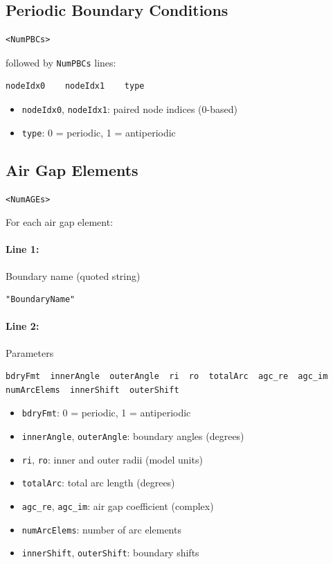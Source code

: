 \documentclass[11pt]{article}
\begin{document}
\subsection{Periodic Boundary Conditions}

\begin{lstlisting}
<NumPBCs>
\end{lstlisting}

followed by \texttt{NumPBCs} lines:

\begin{lstlisting}
nodeIdx0    nodeIdx1    type
\end{lstlisting}

\begin{itemize}[nosep]
  \item \texttt{nodeIdx0}, \texttt{nodeIdx1}: paired node indices (0-based)
  \item \texttt{type}: 0 = periodic, 1 = antiperiodic
\end{itemize}

\subsection{Air Gap Elements}

\begin{lstlisting}
<NumAGEs>
\end{lstlisting}

For each air gap element:

\paragraph{Line 1:} Boundary name (quoted string)
\begin{lstlisting}
"BoundaryName"
\end{lstlisting}

\paragraph{Line 2:} Parameters
\begin{lstlisting}
bdryFmt  innerAngle  outerAngle  ri  ro  totalArc  agc_re  agc_im  numArcElems  innerShift  outerShift
\end{lstlisting}

\begin{itemize}[nosep]
  \item \texttt{bdryFmt}: 0 = periodic, 1 = antiperiodic
  \item \texttt{innerAngle}, \texttt{outerAngle}: boundary angles (degrees)
  \item \texttt{ri}, \texttt{ro}: inner and outer radii (model units)
  \item \texttt{totalArc}: total arc length (degrees)
  \item \texttt{agc\_re}, \texttt{agc\_im}: air gap coefficient (complex)
  \item \texttt{numArcElems}: number of arc elements
  \item \texttt{innerShift}, \texttt{outerShift}: boundary shifts
\end{itemize}
\end{document}

